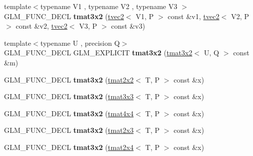 \begin{DoxyCompactItemize}
\item 
\hypertarget{structglm_1_1tmat3x2_a12d9e62a09e2d082664841f719999405}{{\footnotesize template$<$typename V1 , typename V2 , typename V3 $>$ }\\G\-L\-M\-\_\-\-F\-U\-N\-C\-\_\-\-D\-E\-C\-L {\bfseries tmat3x2} (\hyperlink{structglm_1_1tvec2}{tvec2}$<$ V1, P $>$ const \&v1, \hyperlink{structglm_1_1tvec2}{tvec2}$<$ V2, P $>$ const \&v2, \hyperlink{structglm_1_1tvec2}{tvec2}$<$ V3, P $>$ const \&v3)}\label{structglm_1_1tmat3x2_a12d9e62a09e2d082664841f719999405}

\item 
\hypertarget{structglm_1_1tmat3x2_aca2535c7f0a60d41ce48c7cd0a7f83b9}{{\footnotesize template$<$typename U , precision Q$>$ }\\G\-L\-M\-\_\-\-F\-U\-N\-C\-\_\-\-D\-E\-C\-L G\-L\-M\-\_\-\-E\-X\-P\-L\-I\-C\-I\-T {\bfseries tmat3x2} (\hyperlink{structglm_1_1tmat3x2}{tmat3x2}$<$ U, Q $>$ const \&m)}\label{structglm_1_1tmat3x2_aca2535c7f0a60d41ce48c7cd0a7f83b9}

\item 
\hypertarget{structglm_1_1tmat3x2_a115e3ad14a0a68ffec8b0385a160c54a}{G\-L\-M\-\_\-\-F\-U\-N\-C\-\_\-\-D\-E\-C\-L {\bfseries tmat3x2} (\hyperlink{structglm_1_1tmat2x2}{tmat2x2}$<$ T, P $>$ const \&x)}\label{structglm_1_1tmat3x2_a115e3ad14a0a68ffec8b0385a160c54a}

\item 
\hypertarget{structglm_1_1tmat3x2_a0319f70317f9fe7bc6756b2a3931e787}{G\-L\-M\-\_\-\-F\-U\-N\-C\-\_\-\-D\-E\-C\-L {\bfseries tmat3x2} (\hyperlink{structglm_1_1tmat3x3}{tmat3x3}$<$ T, P $>$ const \&x)}\label{structglm_1_1tmat3x2_a0319f70317f9fe7bc6756b2a3931e787}

\item 
\hypertarget{structglm_1_1tmat3x2_ab34ae7f81d9d74f744dfdf474b44fed4}{G\-L\-M\-\_\-\-F\-U\-N\-C\-\_\-\-D\-E\-C\-L {\bfseries tmat3x2} (\hyperlink{structglm_1_1tmat4x4}{tmat4x4}$<$ T, P $>$ const \&x)}\label{structglm_1_1tmat3x2_ab34ae7f81d9d74f744dfdf474b44fed4}

\item 
\hypertarget{structglm_1_1tmat3x2_a3a92638c6e7b1920f14f196614e3bdb9}{G\-L\-M\-\_\-\-F\-U\-N\-C\-\_\-\-D\-E\-C\-L {\bfseries tmat3x2} (\hyperlink{structglm_1_1tmat2x3}{tmat2x3}$<$ T, P $>$ const \&x)}\label{structglm_1_1tmat3x2_a3a92638c6e7b1920f14f196614e3bdb9}

\item 
\hypertarget{structglm_1_1tmat3x2_a10466b97657d80a127b863bb70393b1c}{G\-L\-M\-\_\-\-F\-U\-N\-C\-\_\-\-D\-E\-C\-L {\bfseries tmat3x2} (\hyperlink{structglm_1_1tmat2x4}{tmat2x4}$<$ T, P $>$ const \&x)}\label{structglm_1_1tmat3x2_a10466b97657d80a127b863bb70393b1c}


\end{DoxyCompactItemize}
